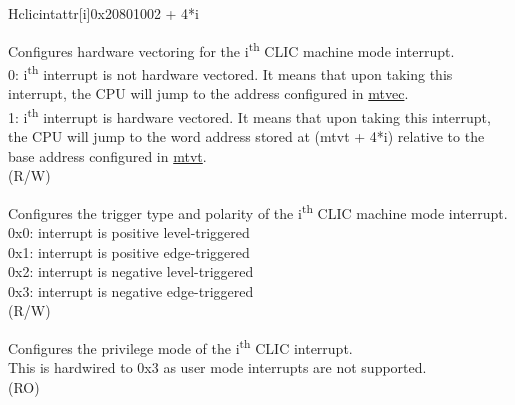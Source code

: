 \begin{register}{H}{{clicintattr[i]}}{0x20801002 + 4*i}\label{regdesc:MCLICINTATTR_REG_i}
%
%
%
%
\regnewline%
\begin{regdesc}
\begin{reglist}
\label{fielddesc:MCLICINTATTR_i_SHV}\item [{SHV}] Configures hardware vectoring for the i\textsuperscript{th} CLIC machine mode interrupt. \\
0: i\textsuperscript{th} interrupt is not hardware vectored. It means that upon taking this interrupt, the CPU will jump to the address configured in \hyperref[fielddesc:MTVECBASE]{mtvec}. \\
1: i\textsuperscript{th} interrupt is hardware vectored. It means that upon taking this interrupt, the CPU will jump to the word address stored at (mtvt + 4*i) relative to the base address configured in \hyperref[fielddesc:MTVTBASE]{mtvt}. \\
(R/W)
\label{fielddesc:MCLICINTATTR_i_TRIG}\item [{TRIG}] Configures the trigger type and polarity of the i\textsuperscript{th} CLIC machine mode interrupt. \\
0x0: interrupt is positive level-triggered \\
0x1: interrupt is positive edge-triggered \\
0x2: interrupt is negative level-triggered \\
0x3: interrupt is negative edge-triggered \\
(R/W)
\label{fielddesc:MCLICINTATTR_i_MODE}\item [{MODE}] Configures the privilege mode of the i\textsuperscript{th} CLIC interrupt. \\
This is hardwired to 0x3 as user mode interrupts are not supported.\\
(RO)
\end{reglist}
\end{regdesc}
\end{register}

